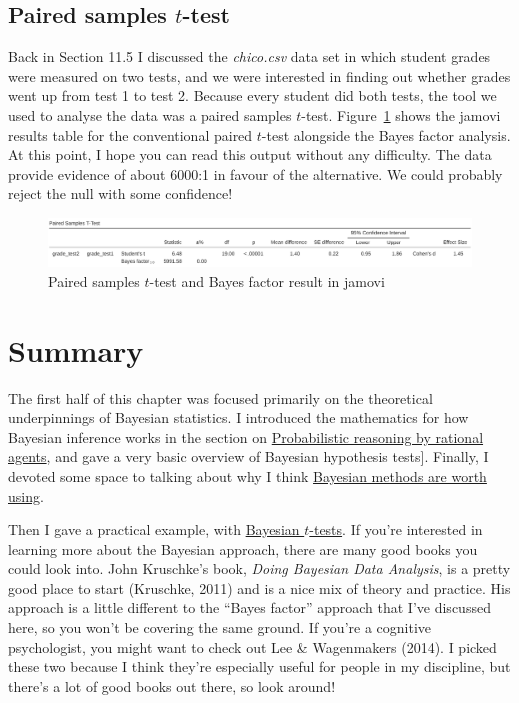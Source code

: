 \documentclass[
  a4paper,
]{book}
\begin{document}
\hypertarget{paired-samples-t-test}{%
\subsection{\texorpdfstring{Paired samples
\(t\)-test}{Paired samples t-test}}\label{paired-samples-t-test}}

Back in Section 11.5 I discussed the \emph{chico.csv} data set in which
student grades were measured on two tests, and we were interested in
finding out whether grades went up from test 1 to test 2. Because every
student did both tests, the tool we used to analyse the data was a
paired samples \(t\)-test. Figure~\ref{fig-fig16-4} shows the jamovi
results table for the conventional paired \(t\)-test alongside the Bayes
factor analysis. At this point, I hope you can read this output without
any difficulty. The data provide evidence of about 6000:1 in favour of
the alternative. We could probably reject the null with some confidence!

\begin{figure}

\includegraphics[width=1\textwidth,height=\textheight]{images/fig16-4.png} \hfill{}

\caption{\label{fig-fig16-4}Paired samples \(t\)-test and Bayes factor
result in jamovi}

\end{figure}

\hypertarget{summary-2}{%
\section{Summary}\label{summary-2}}

The first half of this chapter was focused primarily on the theoretical
underpinnings of Bayesian statistics. I introduced the mathematics for
how Bayesian inference works in the section on
\protect\hyperlink{probabilistic-reasoning-by-rational-agents}{Probabilistic
reasoning by rational agents}, and gave a very basic overview of
Bayesian hypothesis tests{]}. Finally, I devoted some space to talking
about why I think \href{Why\%20be\%20a\%20Bayesian?}{Bayesian methods
are worth using}.

Then I gave a practical example, with
\protect\hyperlink{bayesian-t-tests}{Bayesian \(t\)-tests}. If you're
interested in learning more about the Bayesian approach, there are many
good books you could look into. John Kruschke's book, \emph{Doing
Bayesian Data Analysis}, is a pretty good place to start (Kruschke,
2011) and is a nice mix of theory and practice. His approach is a little
different to the ``Bayes factor'' approach that I've discussed here, so
you won't be covering the same ground. If you're a cognitive
psychologist, you might want to check out Lee \& Wagenmakers (2014). I
picked these two because I think they're especially useful for people in
my discipline, but there's a lot of good books out there, so look
around!
\end{document}
